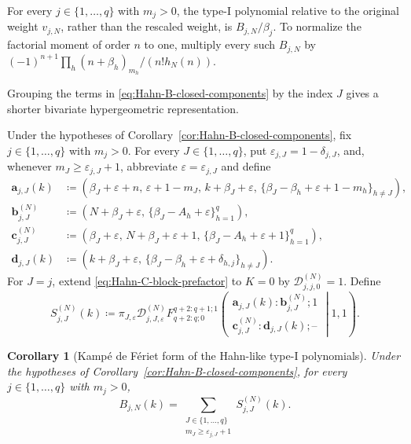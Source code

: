 \documentclass[10pt]{amsart}
\theoremstyle{plain}
\newtheorem{corollary}[theorem]{Corollary}
\theoremstyle{definition}
\theoremstyle{remark}
\begin{document}
For every \(j\in\{1,\ldots,q\}\) with \(m_j>0\), the type-I polynomial
relative to the original weight \(v_{j,N}\), rather than the rescaled
weight, is \(B_{j,N}/\beta_j\). To normalize the factorial moment of order
\(n\) to one, multiply every such \(B_{j,N}\) by
\((-1)^{n+1}\prod_h(n+\beta_h)_{m_h}/(n!h_N(n))\).

Grouping the terms in \eqref{eq:Hahn-B-closed-components} by the index
\(J\) gives a shorter bivariate hypergeometric representation.

Under the hypotheses of Corollary~\ref{cor:Hahn-B-closed-components},
fix \(j\in\{1,\ldots,q\}\) with \(m_j>0\). For every
\(J\in\{1,\ldots,q\}\), put
\(\varepsilon_{j,J}=1-\delta_{j,J}\),
and, whenever \(m_J\ge\varepsilon_{j,J}+1\), abbreviate
\(\varepsilon=\varepsilon_{j,J}\) and define
\begin{align*}
 \boldsymbol a_{j,J}(k)
 &\coloneq{}
 \left(
  \beta_J+\varepsilon+n,\,
  \varepsilon+1-m_J,\,
  k+\beta_J+\varepsilon,\,
  \{\beta_J-\beta_h+\varepsilon+1-m_h\}_{h\ne J}
 \right),\\
 \boldsymbol b_{j,J}^{(N)}
 &\coloneq{}
 \left(
  N+\beta_J+\varepsilon,\,
  \{\beta_J-A_h+\varepsilon\}_{h=1}^q
 \right),\\
 \boldsymbol c_{j,J}^{(N)}
 &\coloneq{}
 \left(
  \beta_J+\varepsilon,\,
  N+\beta_J+\varepsilon+1,\,
  \{\beta_J-A_h+\varepsilon+1\}_{h=1}^q
 \right),\\
 \boldsymbol d_{j,J}(k)
 &\coloneq{}
 \left(
  k+\beta_J+\varepsilon,\,
  \{\beta_J-\beta_h+\varepsilon+\delta_{h,j}\}_{h\ne J}
 \right).
\end{align*}
For \(J=j\), extend \eqref{eq:Hahn-C-block-prefactor} to \(K=0\) by
\(\mathcal D_{j,j,0}^{(N)}=1\). Define
\begin{equation}
 S_{j,J}^{(N)}(k)\coloneq
 \pi_{J,\varepsilon}\mathcal D_{j,J,\varepsilon}^{(N)}
 F_{q+2:q;0}^{q+2:q+1;1}
 \left(
 \begin{matrix}
  \boldsymbol a_{j,J}(k):
  \boldsymbol b_{j,J}^{(N)};1\\
  \boldsymbol c_{j,J}^{(N)}:
  \boldsymbol d_{j,J}(k);\text{--}
 \end{matrix}
 \middle|1,1
 \right).
 \label{eq:Hahn-B-KdF-block}
\end{equation}
\begin{corollary}[Kamp\'e de F\'eriet form of the Hahn-like type-I polynomials]
\label{cor:Hahn-B-KdF}
Under the hypotheses of Corollary~\ref{cor:Hahn-B-closed-components}, for
every \(j\in\{1,\ldots,q\}\) with \(m_j>0\),
\begin{equation}
 B_{j,N}(k)=
 \sum_{\substack{J\in\{1,\ldots,q\}\\
                   m_J\ge\varepsilon_{j,J}+1}}
 S_{j,J}^{(N)}(k).
 \label{eq:Hahn-B-KdF-sum}
\end{equation}
\end{corollary}
\end{document}
